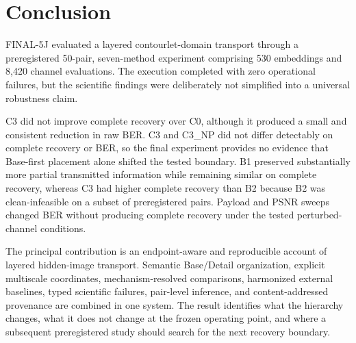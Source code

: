 \section{Conclusion}

FINAL-5J evaluated a layered contourlet-domain transport through a preregistered 50-pair, seven-method experiment comprising 530 embeddings and 8,420 channel evaluations. The execution completed with zero operational failures, but the scientific findings were deliberately not simplified into a universal robustness claim.

C3 did not improve complete recovery over C0, although it produced a small and consistent reduction in raw BER. C3 and C3\_NP did not differ detectably on complete recovery or BER, so the final experiment provides no evidence that Base-first placement alone shifted the tested boundary. B1 preserved substantially more partial transmitted information while remaining similar on complete recovery, whereas C3 had higher complete recovery than B2 because B2 was clean-infeasible on a subset of preregistered pairs. Payload and PSNR sweeps changed BER without producing complete recovery under the tested perturbed-channel conditions.

The principal contribution is an endpoint-aware and reproducible account of layered hidden-image transport. Semantic Base/Detail organization, explicit multiscale coordinates, mechanism-resolved comparisons, harmonized external baselines, typed scientific failures, pair-level inference, and content-addressed provenance are combined in one system. The result identifies what the hierarchy changes, what it does not change at the frozen operating point, and where a subsequent preregistered study should search for the next recovery boundary.
